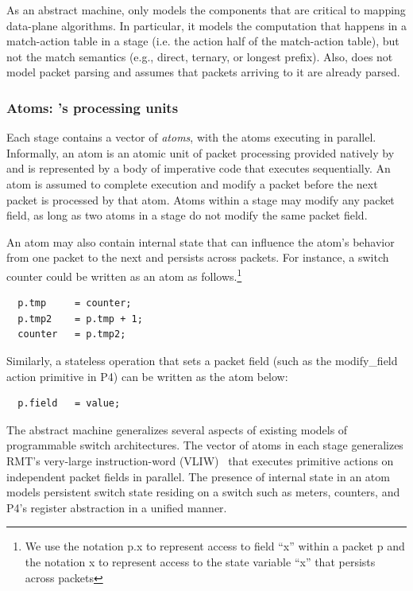 As an abstract machine, \absmachine only models the components that
are critical to mapping data-plane algorithms. In particular, it
models the computation that happens in a match-action table in a stage
(i.e. the action half of the match-action table), but not the match
semantics (e.g., direct, ternary, or longest prefix). Also,
\absmachine does not model packet parsing and assumes that packets
arriving to it are already parsed.


\subsubsection{Atoms: \absmachine's processing units}

Each stage contains a vector of \textit{atoms}, with the atoms
executing in parallel. Informally, an atom is an atomic unit of packet
processing provided natively by \absmachine and is represented by a body of imperative code that
executes sequentially. An atom is assumed to complete execution and
modify a packet before the next packet is processed by that
atom. Atoms within a stage may modify any packet field, as long as two
atoms in a stage do not modify the same packet field.

An atom may also contain internal state that can influence the atom's
behavior from one packet to the next and persists across packets. For
instance, a switch counter could be written as an atom as
follows.\footnote{We use the notation p.x to represent access to field
  ``x'' within a packet p and the notation x to represent access to
  the state variable ``x'' that persists across packets}
\begin{verbatim}
  p.tmp     = counter;
  p.tmp2    = p.tmp + 1;
  counter   = p.tmp2;
\end{verbatim}
Similarly, a stateless operation that sets a packet field (such as the
modify\_field action primitive in P4) can be written as the atom
below:
\begin{verbatim}
  p.field   = value;
\end{verbatim}

The \absmachine abstract machine generalizes several aspects of
existing models of programmable switch architectures. The vector of
atoms in each stage generalizes RMT's very-large instruction-word
(VLIW)~\cite{rmt} that executes primitive actions on independent
packet fields in parallel. The presence of internal state in an atom
models persistent switch state residing on a switch such as meters,
counters, and P4's register abstraction in a unified manner.

